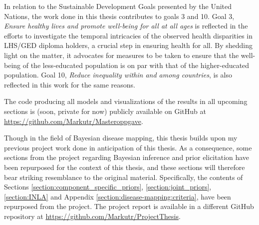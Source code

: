 In relation to the Sustainable Development Goals \citep{UNSDG} presented by the United Nations, the work done in this thesis contributes to goals 3 and 10. Goal 3, \textit{Ensure healthy lives and promote well-being for all at all ages} is reflected in the efforts to investigate the temporal intricacies of the observed health disparities in LHS/GED diploma holders, a crucial step in ensuring health for all. By shedding light on the matter, it advocates for measures to be taken to ensure that the well-being of the less-educated population is on par with that of the higher-educated population. Goal 10, \textit{Reduce inequality within and among countries}, is also reflected in this work for the same reasons.

The code producing all models and visualizations of the results in all upcoming sections is (soon, private for now) publicly available on GitHub at \url{https://github.com/Markutr/Masteroppgave}.

Though in the field of Bayesian disease mapping, this thesis builds upon my previous project work \citep{Prosjektoppgave} done in anticipation of this thesis. As a consequence, some sections from the project regarding Bayesian inference and prior elicitation have been repurposed for the context of this thesis, and these sections will therefore bear striking resemblance to the original material. Specifically, the contents of Sections \ref{section:component_specific_priors}, \ref{section:joint_priors}, \ref{section:INLA} and Appendix \ref{section:disease-mapping:criteria}, have been repurposed from the project. The project report is available in a different GitHub repository at \url{https://github.com/Markutr/ProjectThesis}.






